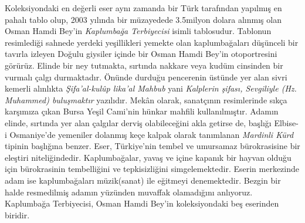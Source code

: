 \indent Koleksiyondaki en değerli eser aynı zamanda bir Türk tarafından yapılmış en pahalı tablo olup, 2003 yılında bir müzayedede 3.5milyon dolara alınmış olan Osman Hamdi Bey'in \textit{Kaplumbağa Terbiyecisi} isimli tablosudur. Tablonun resimlediği sahnede yerdeki yeşillikleri yemekte olan kaplumbağaları düşünceli bir tavırla izleyen Doğulu giysiler içinde bir Osman Hamdi Bey'in otoportresini görürüz.  Elinde bir ney tutmakta, sırtında nakkare veya kudüm cinsinden bir vurmalı çalgı durmaktadır. Önünde durduğu pencerenin üstünde yer alan sivri kemerli alınlıkta \textit{Şifa’al-kulûp lika’al Mahbub} yani \textit{Kalplerin şifası, Sevgiliyle (Hz. Muhammed) buluşmaktır} yazılıdır. Mekân olarak, sanatçının resimlerinde sıkça karşımıza çıkan Bursa Yeşil Cami’nin hünkar mahfili kullanılmıştır. Adamın elinde, sırtında yer alan çalgılar derviş olabileceğini akla getirse de, başlığı Elbise-i Osmaniye’de yemeniler dolanmış keçe kalpak olarak tanımlanan \textit{Mardinli Kürd} tipinin başlığına benzer. Eser, Türkiye'nin tembel ve umursamaz bürokrasisine bir eleştiri niteliğindedir. Kaplumbağalar, yavaş ve içine kapanık bir hayvan olduğu için bürokrasinin tembelliğini ve tepkisizliğini simgelemektedir. Eserin merkezinde adam ise kaplumbağaları müzik(sanat) ile eğitmeyi denemektedir. Bezgin bir halde resmedilmiş adamın yüzünden muvaffak olamadığını anlıyoruz. Kaplumbağa Terbiyecisi, Osman Hamdi Bey’in koleksiyondaki beş eserinden biridir.\newline
